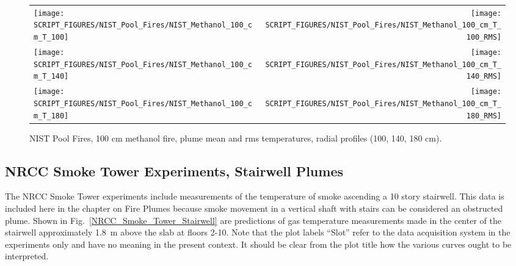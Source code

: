 \begin{figure}[p]
\begin{tabular*}{\textwidth}{l@{\extracolsep{\fill}}r}
\texttt{[image: SCRIPT\_FIGURES/NIST\_Pool\_Fires/NIST\_Methanol\_100\_cm\_T\_100]} &
\texttt{[image: SCRIPT\_FIGURES/NIST\_Pool\_Fires/NIST\_Methanol\_100\_cm\_T\_100\_RMS]} \\
\texttt{[image: SCRIPT\_FIGURES/NIST\_Pool\_Fires/NIST\_Methanol\_100\_cm\_T\_140]} &
\texttt{[image: SCRIPT\_FIGURES/NIST\_Pool\_Fires/NIST\_Methanol\_100\_cm\_T\_140\_RMS]} \\
\texttt{[image: SCRIPT\_FIGURES/NIST\_Pool\_Fires/NIST\_Methanol\_100\_cm\_T\_180]} &
\texttt{[image: SCRIPT\_FIGURES/NIST\_Pool\_Fires/NIST\_Methanol\_100\_cm\_T\_180\_RMS]}
\end{tabular*}
\caption[NIST Pool Fires, 100 cm methanol fire, plume mean and rms temperatures]
{NIST Pool Fires, 100 cm methanol fire, plume mean and rms temperatures, radial profiles (100, 140, 180 cm).}
\label{NIST_Pool_Fires_Plume_Temps_2}
\end{figure}


\clearpage

\subsection{NRCC Smoke Tower Experiments, Stairwell Plumes}

The NRCC Smoke Tower experiments include measurements of the temperature of smoke ascending a 10 story stairwell. This data is included here in the chapter on Fire Plumes because smoke movement in a vertical shaft with stairs can be considered an obstructed plume. Shown in Fig.~\ref{NRCC_Smoke_Tower_Stairwell} are predictions of gas temperature measurements made in the center of the stairwell approximately 1.8~m above the slab at floors 2-10. Note that the plot labels ``Slot'' refer to the data acquisition system in the experiments only and have no meaning in the present context. It should be clear from the plot title how the various curves ought to be interpreted.

\newpage

